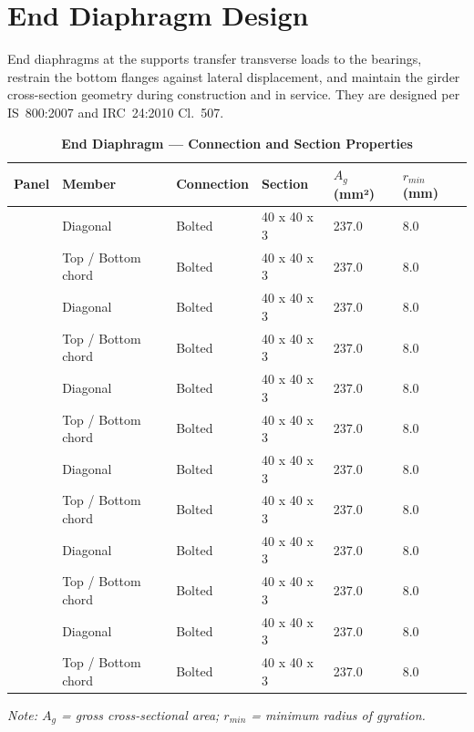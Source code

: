 \documentclass[12pt,a4paper]{report}
\numberwithin{table}{chapter}
\numberwithin{figure}{chapter}
\begin{document}
\section{End Diaphragm Design}
\label{sec:end-diaphragm}

End diaphragms at the supports transfer transverse loads to the bearings, restrain the bottom flanges against lateral displacement, and maintain the girder cross-section geometry during construction and in service. They are designed per IS~800:2007 and IRC~24:2010 Cl.~507.

\vspace{1em}

\vspace{0.4em}
\noindent
\setlength{\tabcolsep}{4pt}
\setlength{\LTleft}{0pt}
\setlength{\LTright}{\fill}

\begin{longtable}{|C{2.0cm}|L{2.0cm}|L{2.2cm}|C{2.5cm}|C{2.0cm}|C{2.0cm}|}
\caption{\textbf{End Diaphragm --- Connection and Section Properties}}
\hline
\textbf{Panel} & \textbf{Member} & \textbf{Connection} & \textbf{Section} & \textbf{$A_g$ (mm²)} & \textbf{$r_{min}$ (mm)} \\[6pt]
\hline
{} & Diagonal & Bolted & 40 x 40 x 3 & 237.0 & 8.0 \\[6pt]
 & Top / Bottom chord & Bolted & 40 x 40 x 3 & 237.0 & 8.0 \\[6pt]
\hline
{} & Diagonal & Bolted & 40 x 40 x 3 & 237.0 & 8.0 \\[6pt]
 & Top / Bottom chord & Bolted & 40 x 40 x 3 & 237.0 & 8.0 \\[6pt]
\hline
{} & Diagonal & Bolted & 40 x 40 x 3 & 237.0 & 8.0 \\[6pt]
 & Top / Bottom chord & Bolted & 40 x 40 x 3 & 237.0 & 8.0 \\[6pt]
\hline
{} & Diagonal & Bolted & 40 x 40 x 3 & 237.0 & 8.0 \\[6pt]
 & Top / Bottom chord & Bolted & 40 x 40 x 3 & 237.0 & 8.0 \\[6pt]
\hline
{} & Diagonal & Bolted & 40 x 40 x 3 & 237.0 & 8.0 \\[6pt]
 & Top / Bottom chord & Bolted & 40 x 40 x 3 & 237.0 & 8.0 \\[6pt]
\hline
{} & Diagonal & Bolted & 40 x 40 x 3 & 237.0 & 8.0 \\[6pt]
 & Top / Bottom chord & Bolted & 40 x 40 x 3 & 237.0 & 8.0 \\[6pt]
\hline
\end{longtable}
\noindent\textit{Note: $A_g$ = gross cross-sectional area; $r_{min}$ = minimum radius of gyration.}
\end{document}
